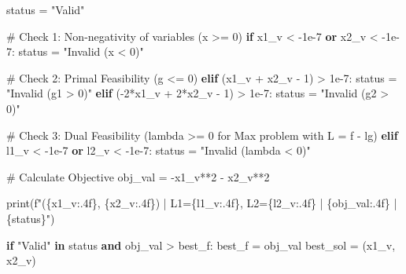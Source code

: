 \documentclass[
  letterpaper,
  DIV=11,
  numbers=noendperiod]{scrreprt}
\newenvironment{Shaded}{\begin{snugshade}}{\end{snugshade}}
\newcommand{\BuiltInTok}[1]{\textcolor[rgb]{0.00,0.23,0.31}{#1}}
\newcommand{\CommentTok}[1]{\textcolor[rgb]{0.37,0.37,0.37}{#1}}
\newcommand{\ControlFlowTok}[1]{\textcolor[rgb]{0.00,0.23,0.31}{\textbf{#1}}}
\newcommand{\DecValTok}[1]{\textcolor[rgb]{0.68,0.00,0.00}{#1}}
\newcommand{\FloatTok}[1]{\textcolor[rgb]{0.68,0.00,0.00}{#1}}
\newcommand{\KeywordTok}[1]{\textcolor[rgb]{0.00,0.23,0.31}{\textbf{#1}}}
\newcommand{\NormalTok}[1]{\textcolor[rgb]{0.00,0.23,0.31}{#1}}
\newcommand{\OperatorTok}[1]{\textcolor[rgb]{0.37,0.37,0.37}{#1}}
\newcommand{\SpecialCharTok}[1]{\textcolor[rgb]{0.37,0.37,0.37}{#1}}
\newcommand{\SpecialStringTok}[1]{\textcolor[rgb]{0.13,0.47,0.30}{#1}}
\newcommand{\StringTok}[1]{\textcolor[rgb]{0.13,0.47,0.30}{#1}}
\begin{document}
\begin{Shaded}
\begin{Highlighting}[]
\NormalTok{    status }\OperatorTok{=} \StringTok{"Valid"}
    
    \CommentTok{\# Check 1: Non{-}negativity of variables (x \textgreater{}= 0)}
    \ControlFlowTok{if}\NormalTok{ x1\_v }\OperatorTok{\textless{}} \OperatorTok{{-}}\FloatTok{1e{-}7} \KeywordTok{or}\NormalTok{ x2\_v }\OperatorTok{\textless{}} \OperatorTok{{-}}\FloatTok{1e{-}7}\NormalTok{:}
\NormalTok{        status }\OperatorTok{=} \StringTok{"Invalid (x \textless{} 0)"}
        
    \CommentTok{\# Check 2: Primal Feasibility (g \textless{}= 0)}
    \ControlFlowTok{elif}\NormalTok{ (x1\_v }\OperatorTok{+}\NormalTok{ x2\_v }\OperatorTok{{-}} \DecValTok{1}\NormalTok{) }\OperatorTok{\textgreater{}} \FloatTok{1e{-}7}\NormalTok{:}
\NormalTok{        status }\OperatorTok{=} \StringTok{"Invalid (g1 \textgreater{} 0)"}
    \ControlFlowTok{elif}\NormalTok{ (}\OperatorTok{{-}}\DecValTok{2}\OperatorTok{*}\NormalTok{x1\_v }\OperatorTok{+} \DecValTok{2}\OperatorTok{*}\NormalTok{x2\_v }\OperatorTok{{-}} \DecValTok{1}\NormalTok{) }\OperatorTok{\textgreater{}} \FloatTok{1e{-}7}\NormalTok{:}
\NormalTok{        status }\OperatorTok{=} \StringTok{"Invalid (g2 \textgreater{} 0)"}
        
    \CommentTok{\# Check 3: Dual Feasibility (lambda \textgreater{}= 0 for Max problem with L = f {-} lg)}
    \ControlFlowTok{elif}\NormalTok{ l1\_v }\OperatorTok{\textless{}} \OperatorTok{{-}}\FloatTok{1e{-}7} \KeywordTok{or}\NormalTok{ l2\_v }\OperatorTok{\textless{}} \OperatorTok{{-}}\FloatTok{1e{-}7}\NormalTok{:}
\NormalTok{        status }\OperatorTok{=} \StringTok{"Invalid (lambda \textless{} 0)"}
    
    \CommentTok{\# Calculate Objective}
\NormalTok{    obj\_val }\OperatorTok{=} \OperatorTok{{-}}\NormalTok{x1\_v}\OperatorTok{**}\DecValTok{2} \OperatorTok{{-}}\NormalTok{ x2\_v}\OperatorTok{**}\DecValTok{2}
    
    \BuiltInTok{print}\NormalTok{(}\SpecialStringTok{f"(}\SpecialCharTok{\{}\NormalTok{x1\_v}\SpecialCharTok{:.4f\}}\SpecialStringTok{, }\SpecialCharTok{\{}\NormalTok{x2\_v}\SpecialCharTok{:.4f\}}\SpecialStringTok{)   | L1=}\SpecialCharTok{\{}\NormalTok{l1\_v}\SpecialCharTok{:.4f\}}\SpecialStringTok{, L2=}\SpecialCharTok{\{}\NormalTok{l2\_v}\SpecialCharTok{:.4f\}}\SpecialStringTok{ | }\SpecialCharTok{\{}\NormalTok{obj\_val}\SpecialCharTok{:.4f\}}\SpecialStringTok{     | }\SpecialCharTok{\{}\NormalTok{status}\SpecialCharTok{\}}\SpecialStringTok{"}\NormalTok{)}
    
    \ControlFlowTok{if} \StringTok{"Valid"} \KeywordTok{in}\NormalTok{ status }\KeywordTok{and}\NormalTok{ obj\_val }\OperatorTok{\textgreater{}}\NormalTok{ best\_f:}
\NormalTok{        best\_f }\OperatorTok{=}\NormalTok{ obj\_val}
\NormalTok{        best\_sol }\OperatorTok{=}\NormalTok{ (x1\_v, x2\_v)}


\end{Highlighting}
\end{Shaded}
\end{document}
